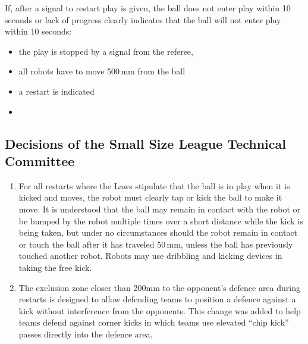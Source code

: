 If, after a signal to restart play is given, the ball does not enter play within 10 seconds\removed{,} or lack of progress clearly indicates that the ball will not enter play within 10 seconds:
\begin{itemize}
\item the play is stopped by a signal from the referee,
\item all robots have to move 500\,mm from the ball
\item a  restart is indicated
\item {}
\end{itemize}

\subsection*{Decisions of the Small Size League Technical Committee}
\begin{enumerate}
\item
For all restarts where the Laws stipulate that the ball is in play when it is kicked and moves, the robot must clearly tap or kick the ball to make it move.
It is understood that the ball may remain in contact with the robot or be bumped by the robot multiple times over a short distance while the kick is being taken, but under no circumstances should the robot remain in contact or touch the ball after it has traveled 50\,mm, unless the ball has previously touched another robot.
Robots may use dribbling and kicking devices in taking the free kick.

\item
The exclusion zone closer than 200\added{\,}mm to the opponent's defence area during restarts is designed to allow defending teams to position a defence against a kick without interference from the opponents.
This change was added to help teams defend against corner kicks in which teams use elevated ``chip kick'' passes directly into the defence area.
\end{enumerate}
